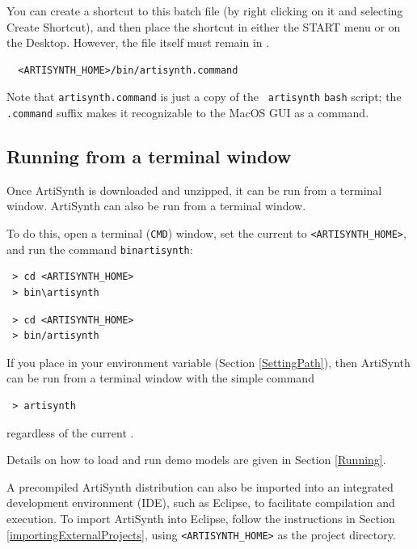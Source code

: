 You can create a shortcut to this batch file (by right clicking on it
and selecting {\sf Create Shortcut}), and then place the shortcut in
either the {\sf START} menu or on the Desktop. However, the file
itself must remain in .
\fi
\ifMacOS
\begin{verbatim}
  <ARTISYNTH_HOME>/bin/artisynth.command
\end{verbatim}
Note that {\tt artisynth.command} is just a copy of the {\tt
artisynth} {\tt bash} script; the {\tt .command} suffix makes it
recognizable to the MacOS GUI as a command.
\fi
\fi %

\subsection{Running from a terminal window}
\label{artisynthCommandLine}

\ifLinux
Once ArtiSynth is downloaded and unzipped, it can be
run from a terminal window.
\else %
ArtiSynth can also be run from a terminal window.
\fi %

To do this, open a terminal 
\ifWindows
({\tt CMD})
\fi
window, set the current \directory{} to {\tt <ARTISYNTH\_HOME>}, and
run the command {\tt bin\SEP artisynth}:
\ifWindows
\begin{verbatim}
 > cd <ARTISYNTH_HOME>
 > bin\artisynth
\end{verbatim}
\else
\begin{verbatim}
 > cd <ARTISYNTH_HOME>
 > bin/artisynth
\end{verbatim}
\fi

\begin{sideblock}
If you place  in your \PATH{} environment
variable (Section \ref{SettingPath}), then ArtiSynth can be
run from a terminal window with the simple command
\begin{verbatim}
 > artisynth
\end{verbatim}
regardless of the current \directory{}.
\end{sideblock}

Details on how to load and run demo models are given in
Section \ref{Running}.

A precompiled ArtiSynth distribution can also be imported into an
integrated development environment (IDE), such as Eclipse, to
facilitate compilation and execution. To import ArtiSynth into
Eclipse, follow the instructions in
Section \ref{importingExternalProjects}, using {\tt <ARTISYNTH\_HOME>}
as the project directory.

